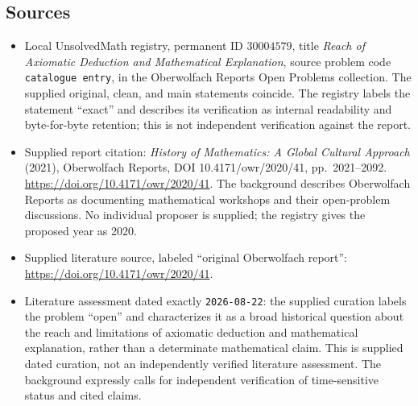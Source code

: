 \documentclass[11pt]{article}
\begin{document}
\subsection{Sources}
\begin{itemize}
\item Local UnsolvedMath registry, permanent ID \(30004579\), title \emph{Reach of Axiomatic Deduction and Mathematical Explanation}, source problem code \texttt{catalogue entry}, in the Oberwolfach Reports Open Problems collection. The supplied original, clean, and main statements coincide. The registry labels the statement ``exact'' and describes its verification as internal readability and byte-for-byte retention; this is not independent verification against the report.
\item Supplied report citation: \emph{History of Mathematics: A Global Cultural Approach} (2021), Oberwolfach Reports, DOI 10.4171/owr/2020/41, pp.\ 2021--2092. \url{https://doi.org/10.4171/owr/2020/41}. The background describes Oberwolfach Reports as documenting mathematical workshops and their open-problem discussions. No individual proposer is supplied; the registry gives the proposed year as 2020.
\item Supplied literature source, labeled ``original Oberwolfach report'': \url{https://doi.org/10.4171/owr/2020/41}.
\item Literature assessment dated exactly \texttt{2026-08-22}: the supplied curation labels the problem ``open'' and characterizes it as a broad historical question about the reach and limitations of axiomatic deduction and mathematical explanation, rather than a determinate mathematical claim. This is supplied dated curation, not an independently verified literature assessment. The background expressly calls for independent verification of time-sensitive status and cited claims.
\end{itemize}
\end{document}
